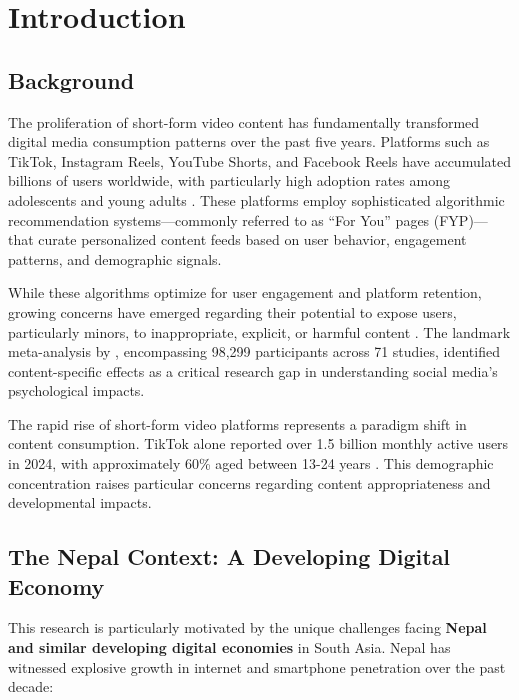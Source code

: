 \documentclass[11pt,a4paper]{article}
\begin{document}
\newpage

\section{Introduction}

\subsection{Background}

The proliferation of short-form video content has fundamentally transformed digital media consumption patterns over the past five years. Platforms such as TikTok, Instagram Reels, YouTube Shorts, and Facebook Reels have accumulated billions of users worldwide, with particularly high adoption rates among adolescents and young adults \citep{anderson2023teens}. These platforms employ sophisticated algorithmic recommendation systems---commonly referred to as ``For You'' pages (FYP)---that curate personalized content feeds based on user behavior, engagement patterns, and demographic signals.

While these algorithms optimize for user engagement and platform retention, growing concerns have emerged regarding their potential to expose users, particularly minors, to inappropriate, explicit, or harmful content \citep{nguyen2025feeds}. The landmark meta-analysis by \citet{nguyen2025feeds}, encompassing 98,299 participants across 71 studies, identified content-specific effects as a critical research gap in understanding social media's psychological impacts.

The rapid rise of short-form video platforms represents a paradigm shift in content consumption. TikTok alone reported over 1.5 billion monthly active users in 2024, with approximately 60\% aged between 13-24 years \citep{datareportal2024}. This demographic concentration raises particular concerns regarding content appropriateness and developmental impacts.

\subsection{The Nepal Context: A Developing Digital Economy}

This research is particularly motivated by the unique challenges facing \textbf{Nepal and similar developing digital economies} in South Asia. Nepal has witnessed explosive growth in internet and smartphone penetration over the past decade:
\end{document}
